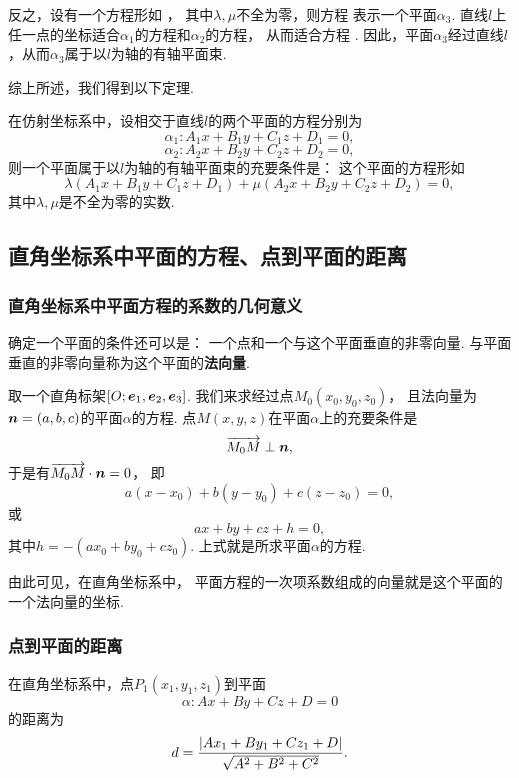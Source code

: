 反之，设有一个方程形如 ，
其中\(\lambda,\mu\)不全为零，则方程 
表示一个平面\(\alpha_3\).
直线\(l\)上任一点的坐标适合\(\alpha_1\)的方程和\(\alpha_2\)的方程，
从而适合方程 .
因此，平面\(\alpha_3\)经过直线\(l\)，从而\(\alpha_3\)属于以\(l\)为轴的有轴平面束.

综上所述，我们得到以下定理.
\begin{theorem}
在仿射坐标系中，设相交于直线\(l\)的两个平面的方程分别为\[
	\alpha_1: A_1 x + B_1 y + C_1 z + D_1 = 0,
\]\[
	\alpha_2: A_2 x + B_2 y + C_2 z + D_2 = 0,
\]
则一个平面属于以\(l\)为轴的有轴平面束的充要条件是：
这个平面的方程形如\[
	\lambda	(A_1 x + B_1 y + C_1 z + D_1)
	+ \mu	(A_2 x + B_2 y + C_2 z + D_2) = 0,
\]
其中\(\lambda,\mu\)是不全为零的实数.
\end{theorem}

\subsection{直角坐标系中平面的方程、点到平面的距离}

\subsubsection{直角坐标系中平面方程的系数的几何意义}
确定一个平面的条件还可以是：
一个点和一个与这个平面垂直的非零向量.
与平面垂直的非零向量称为这个平面的\textbf{法向量}.

取一个直角标架\([O;\boldsymbol{e}_1,\boldsymbol{e}_2,\boldsymbol{e}_3]\).
我们来求经过点\(M_0(x_0,y_0,z_0)\)，
且法向量为\(\boldsymbol{n}=(a,b,c)\)的平面\(\alpha\)的方程.
点\(M(x,y,z)\)在平面\(\alpha\)上的充要条件是\[
	\overrightarrow{M_0 M} \perp \boldsymbol{n},
\]
于是有\(\overrightarrow{M_0 M} \cdot \boldsymbol{n} = 0\)，
即\[
	a(x-x_0) + b(y-y_0) + c(z-z_0) = 0,
\]或\[
	a x + b y + c z + h = 0,
\]其中\(h=-(a x_0 + b y_0 + c z_0)\).
上式就是所求平面\(\alpha\)的方程.

由此可见，在直角坐标系中，
平面方程的一次项系数组成的向量就是这个平面的一个法向量的坐标.

\subsubsection{点到平面的距离}
\begin{theorem}
在直角坐标系中，点\(P_1(x_1,y_1,z_1)\)到平面\[
	\alpha: A x + B y + C z + D = 0
\]的距离为
\begin{equation}
	d = \frac{\abs{A x_1 + B y_1 + C z_1 + D}}{\sqrt{A^2 + B^2 + C^2}}.
\end{equation}
\end{theorem}

